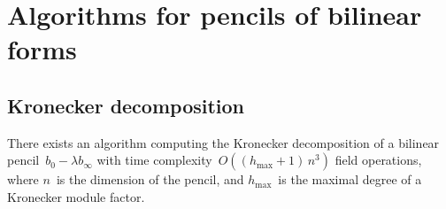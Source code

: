 \documentclass{amsart}
\begin{document}
\appendix
\section{Algorithms for pencils of bilinear forms}
\label{ap:bilinear}
\subsection{Kronecker decomposition}
\label{ap:kronecker}

\begin{prop}
There exists an algorithm computing the Kronecker decomposition
of a bilinear pencil~$b_0 -λ b_∞$
with time complexity~$O((h_{\max} + 1)\, n^3)$ field operations,
where $n$~is the dimension of the pencil,
and $h_{\max}$~is the maximal degree of a Kronecker module factor.
\end{prop}
\end{document}
